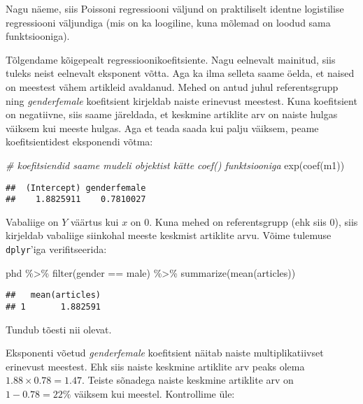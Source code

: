 \documentclass[
]{book}
\newenvironment{Shaded}{\begin{snugshade}}{\end{snugshade}}
\newcommand{\CommentTok}[1]{\textcolor[rgb]{0.56,0.35,0.01}{\textit{#1}}}
\newcommand{\FunctionTok}[1]{\textcolor[rgb]{0.00,0.00,0.00}{#1}}
\newcommand{\NormalTok}[1]{#1}
\newcommand{\SpecialCharTok}[1]{\textcolor[rgb]{0.00,0.00,0.00}{#1}}
\newcommand{\StringTok}[1]{\textcolor[rgb]{0.31,0.60,0.02}{#1}}
\begin{document}
Nagu näeme, siis Poissoni regressiooni väljund on praktiliselt identne logistilise regressiooni väljundiga (mis on ka loogiline, kuna mõlemad on loodud sama funktsiooniga).

Tõlgendame kõigepealt regressioonikoefitsiente. Nagu eelnevalt mainitud, siis tuleks neist eelnevalt eksponent võtta. Aga ka ilma selleta saame öelda, et naised on meestest vähem artikleid avaldanud. Mehed on antud juhul referentsgrupp ning \emph{genderfemale} koefitsient kirjeldab naiste erinevust meestest. Kuna koefitsient on negatiivne, siis saame järeldada, et keskmine artiklite arv on naiste hulgas väiksem kui meeste hulgas. Aga et teada saada kui palju väiksem, peame koefitsientidest eksponendi võtma:

\begin{Shaded}
\begin{Highlighting}[]
\CommentTok{\# koefitsiendid saame mudeli objektist kätte coef() funktsiooniga}
\FunctionTok{exp}\NormalTok{(}\FunctionTok{coef}\NormalTok{(m1))}
\end{Highlighting}
\end{Shaded}

\begin{verbatim}
##  (Intercept) genderfemale 
##    1.8825911    0.7810027
\end{verbatim}

Vabaliige on \(Y\) väärtus kui \(x\) on \(0\). Kuna mehed on referentsgrupp (ehk siis \(0\)), siis kirjeldab vabaliige siinkohal meeste keskmist artiklite arvu. Võime tulemuse \texttt{dplyr}'iga verifitseerida:

\begin{Shaded}
\begin{Highlighting}[]
\NormalTok{phd }\SpecialCharTok{\%\textgreater{}\%} 
  \FunctionTok{filter}\NormalTok{(gender }\SpecialCharTok{==} \StringTok{\textquotesingle{}male\textquotesingle{}}\NormalTok{) }\SpecialCharTok{\%\textgreater{}\%} 
  \FunctionTok{summarize}\NormalTok{(}\FunctionTok{mean}\NormalTok{(articles))}
\end{Highlighting}
\end{Shaded}

\begin{verbatim}
##   mean(articles)
## 1       1.882591
\end{verbatim}

Tundub tõesti nii olevat.

Eksponenti võetud \emph{genderfemale} koefitsient näitab naiste multiplikatiivset erinevust meestest. Ehk siis naiste keskmine artiklite arv peaks olema \(1.88 \times 0.78 = 1.47\). Teiste sõnadega naiste keskmine artiklite arv on \(1-0.78 = 22\%\) väiksem kui meestel. Kontrollime üle:
\end{document}
